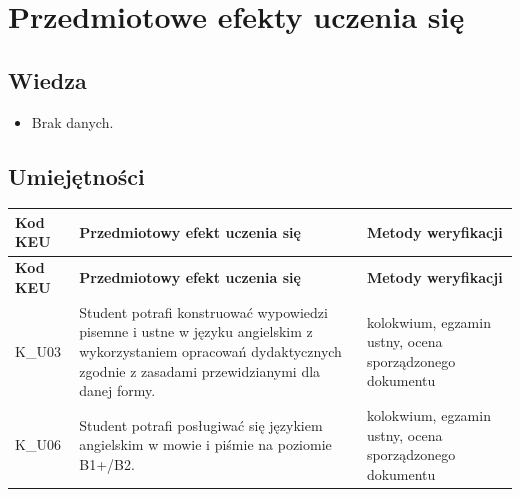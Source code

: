 \documentclass[12pt, a4paper]{article}
\newcommand{\thdrule}{\noalign{\global\setlength{\extrarowheight}{0pt}}}
\newcommand{\thdend}{\noalign{\global\setlength{\extrarowheight}{3pt}}}
\begin{document}
\section{Przedmiotowe efekty uczenia się}

\subsection*{Wiedza}
\begin{itemize}
  \item Brak danych.
\end{itemize}

\subsection*{Umiejętności}
{\scriptsize
\begin{longtable}{m{1.6cm}m{9.0cm}m{4.2cm}}
\thdrule\toprule
\rowcolor{pjatkRed} {\color{white}\footnotesize\textbf{\vphantom{Ag}Kod KEU}} & {\color{white}\footnotesize\textbf{\vphantom{Ag}Przedmiotowy efekt uczenia się}} & {\color{white}\footnotesize\textbf{\vphantom{Ag}Metody weryfikacji}} \\
\midrule\thdend
\endfirsthead
\thdrule\toprule
\rowcolor{pjatkRed} {\color{white}\footnotesize\textbf{\vphantom{Ag}Kod KEU}} & {\color{white}\footnotesize\textbf{\vphantom{Ag}Przedmiotowy efekt uczenia się}} & {\color{white}\footnotesize\textbf{\vphantom{Ag}Metody weryfikacji}} \\
\midrule\thdend
\endhead
  \rowcolor{tableRowLight} K\_U03 & Student potrafi konstruować wypowiedzi pisemne i ustne w języku angielskim z wykorzystaniem opracowań dydaktycznych zgodnie z zasadami przewidzianymi dla danej formy. & kolokwium, egzamin ustny, ocena sporządzonego dokumentu \\
  \rowcolor{tableRowAlt} K\_U06 & Student potrafi posługiwać się językiem angielskim w mowie i piśmie na poziomie B1+/B2. & kolokwium, egzamin ustny, ocena sporządzonego dokumentu \\
\bottomrule
\end{longtable}}
\end{document}
